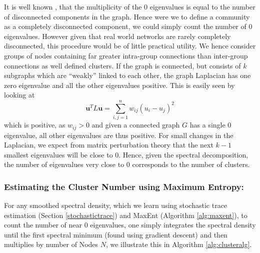 \documentclass[letterpaper]{article} %
\begin{document}
It is well known \cite{von2007tutorial}, that the multiplicity of the $0$ eigenvalues is equal to the number of disconnected components in the graph. Hence were we to define a community as a completely disconnected component, we could simply count the number of $0$ eigenvalues. However given that real world networks are rarely completely disconnected, this procedure would be of little practical utility. We hence consider groups of nodes containing far greater intra-group connections than inter-group connections as well defined clusters. %
If the graph is connected, but consists of $k$ subgraphs which are ``weakly'' linked to each other, the graph Laplacian has one zero eigenvalue and all the other eigenvalues positive. 
This is easily seen by looking at
\begin{equation}
\mathbf{u}^{T}L \mathbf{u} = \sum_{i,j=1}^{n}w_{ij}(u_{i}-u_{j})^{2}
\end{equation}
which is positive, as $w_{ij}>0$ and given a connected graph $G$ has a single $0$ eigenvalue, all other eigenvalues are thus positive. For small changes in the Laplacian, we expect from matrix perturbation theory \citep{bhatia2013matrix} that the next $k-1$ smallest eigenvalues will be close to $0$. Hence, given the spectral decomposition, the number of eigenvalues very close to $0$ corresponds to the number of clusters. 
\subsubsection{Estimating the Cluster Number using Maximum Entropy:}
For any smoothed spectral density, which we learn using stochastic trace estimation (Section \ref{stochastictrace}) and MaxEnt (Algorithm \ref{alg:maxent}), to count the number of near $0$ eigenvalues, one simply integrates the spectral density until the first spectral minimum (found using gradient descent) and then multiplies by number of Nodes $N$, we illustrate this in Algorithm \ref{alg:clusteralg}.
\end{document}
